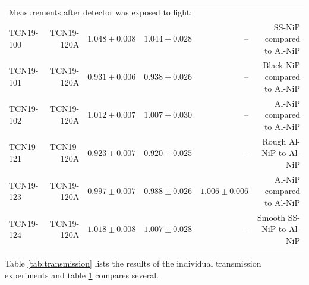 \documentclass[10pt,letterpaper]{article}
\begin{document}
\begin{table}
\begin{tabular}{l r r r r r}
\midrule
\multicolumn{5}{l}{Measurements after detector was exposed to light:} \\ 
TCN19-100 & TCN19-120A & $1.048 \pm 0.008$ & $1.044 \pm 0.028$ & -- & SS-NiP compared to Al-NiP \\
TCN19-101 & TCN19-120A & $0.931 \pm 0.006$ & $0.938 \pm 0.026$ & -- & Black NiP compared to Al-NiP \\
TCN19-102 & TCN19-120A & $1.012 \pm 0.007$ & $1.007 \pm 0.030$ & -- & Al-NiP compared to Al-NiP \\
TCN19-121 & TCN19-120A & $0.923 \pm 0.007$ & $0.920 \pm 0.025$ & -- & Rough Al-NiP to Al-NiP \\
TCN19-123 & TCN19-120A & $0.997 \pm 0.007$ & $0.988 \pm 0.026$ & $1.006 \pm 0.006$ & Al-NiP compared to Al-NiP \\
TCN19-124 & TCN19-120A & $1.018 \pm 0.008$ & $1.007 \pm 0.028$ & -- & Smooth SS-NiP to Al-NiP \\
\bottomrule
\end{tabular}
\label{tab:transmission_comparison}
\end{table}

Table \ref{tab:transmission} lists the results of the individual transmission experiments and table \ref{tab:transmission_comparison} compares several.
\end{document}
